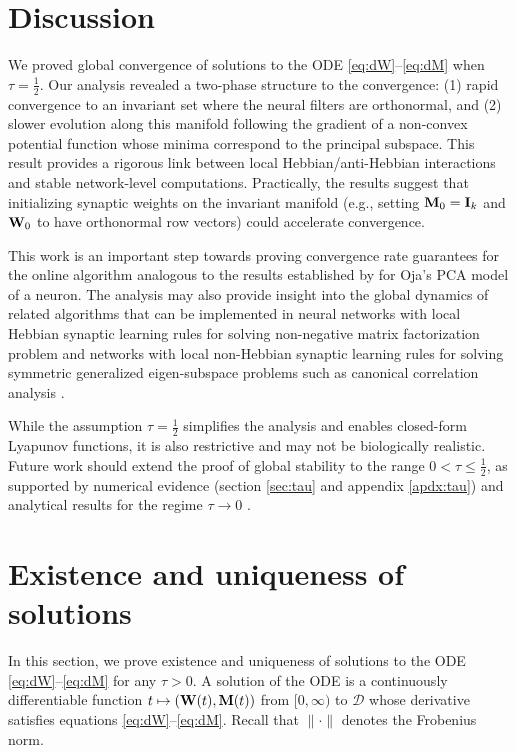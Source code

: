 \documentclass[11pt]{article}
\theoremstyle{definition}
\newcommand{\I}{{\bf I}}
\newcommand{\M}{{\bf M}}
\newcommand{\W}{{\bf W}}
\newcommand{\calD}{\mathcal{D}}
\begin{document}
\section{Discussion}

We proved global convergence of solutions to the ODE \eqref{eq:dW}--\eqref{eq:dM} when $\tau=\frac12$. Our analysis revealed a two-phase structure to the convergence: (1) rapid convergence to an invariant set where the neural filters are orthonormal, and (2) slower evolution along this manifold following the gradient of a non-convex potential function whose minima correspond to the principal subspace. This result provides a rigorous link between local Hebbian/anti-Hebbian interactions and stable network-level computations. Practically, the results suggest that initializing synaptic weights on the invariant manifold (e.g., setting $\M_0=\I_k$ and $\W_0$ to have orthonormal row vectors) could accelerate convergence.

This work is an important step towards proving convergence rate guarantees for the online algorithm analogous to the results established by \citet{chou2020ode} for Oja's PCA model of a neuron. The analysis may also provide insight into the global dynamics of related algorithms that can be implemented in neural networks with local Hebbian synaptic learning rules for solving non-negative matrix factorization problem \citep{pehlevan2019neuroscience} and networks with local non-Hebbian synaptic learning rules for solving symmetric generalized eigen-subspace problems such as canonical correlation analysis \citep{lipshutz2021biologically,lipshutz2023normative}.

While the assumption $\tau=\frac12$ simplifies the analysis and enables closed-form Lyapunov functions, it is also restrictive and may not be biologically realistic.
Future work should extend the proof of global stability to the range $0<\tau\le\frac12$, as supported by numerical evidence (section \ref{sec:tau} and appendix \ref{apdx:tau}) and analytical results for the regime $\tau\to0$ \citep{centorrino2025similarity}.

\appendix
\section{Existence and uniqueness of solutions}\label{apdx:exist}

In this section, we prove existence and uniqueness of solutions to the ODE \eqref{eq:dW}--\eqref{eq:dM} for any $\tau>0$. A solution of the ODE is a continuously differentiable function $t\mapsto(\W(t),\M(t))$ from $[0,\infty)$ to $\calD$ whose derivative satisfies equations \eqref{eq:dW}--\eqref{eq:dM}. Recall that $\|\cdot\|$ denotes the Frobenius norm.
\end{document}
